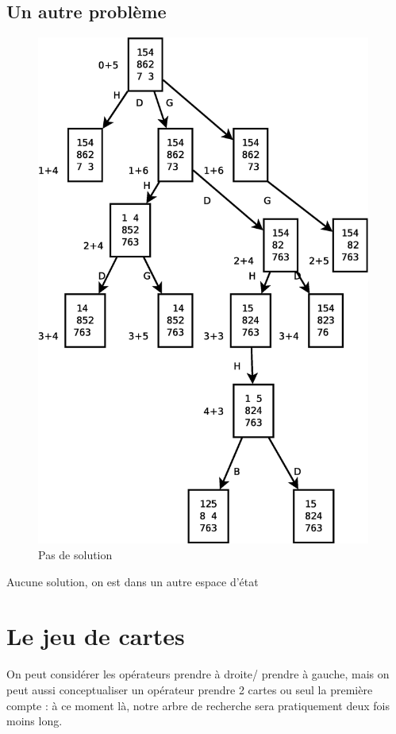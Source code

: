 \documentclass[12pt,a4paper,openany]{book}
\begin{document}
	\subsection{Un autre problème}
	\begin{figure}[H]
		\centering
		\includegraphics[width=11cm]{Diagramme5.eps}
		\caption{Pas de solution}
	\end{figure}
	\begin{remarque}
		Aucune solution, on est dans un autre espace d'état
	\end{remarque}
	\section{Le jeu de cartes}
	On peut considérer les opérateurs prendre à droite/ prendre à gauche, mais on peut aussi conceptualiser un opérateur prendre 2 cartes ou seul la
	première compte : à ce moment là, notre arbre de recherche sera pratiquement deux fois moins long.
\end{document}
